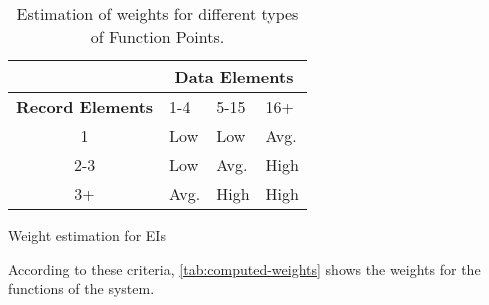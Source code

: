 \begin{table}[h]
\begin{subtable}{\textwidth}
    \centering
    \begin{tabular}{| c | l | l | l |}
        \hline
         & \multicolumn{3}{c|}{\textbf{Data Elements}} \\
        \hline
        \textbf{Record Elements} & 1-4 & 5-15 & 16+ \\
        \hline
        1       & Low     & Low     & Avg.     \\
        2-3     & Low     & Avg.    & High     \\
        3+      & Avg.    & High    & High     \\
        \hline
    \end{tabular}
    \caption{Weight estimation for EIs}
\end{subtable}
\caption{Estimation of weights for different types of Function Points.}
\label{tab:weight-estimation}
\end{table}

According to these criteria, \autoref{tab:computed-weights} shows the weights for the functions of the system.

